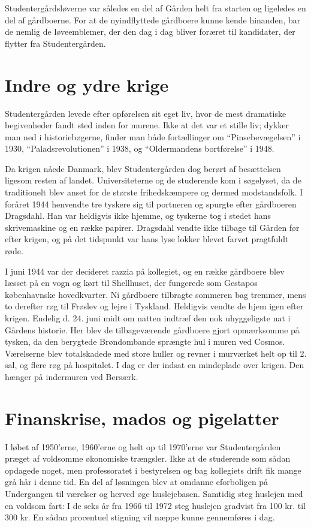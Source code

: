 \documentclass[11pt,article,twoside,openany,danish,extrafontsizes]{memoir} %
\begin{document}
Studentergårdsløverne var således en del af Gården helt fra starten og ligeledes en del af gårdboerne. For at de nyindflyttede gårdboere kunne kende hinanden, bar de nemlig de løveemblemer, der den dag i dag bliver foræret til kandidater, der flytter fra Studentergården.



\section{Indre og ydre krige}
Studentergården levede efter opførelsen sit eget liv, hvor de mest dramatiske begivenheder fandt sted inden for murene. Ikke at det var et stille liv; dykker man ned i historiebøgerne, finder man både fortællinger om \enquote{Pinsebevægelsen} i 1930, \enquote{Paladsrevolutionen} i 1938, og \enquote{Oldermandens bortførelse} i 1948.

Da krigen nåede Danmark, blev Studentergården dog berørt af besættelsen ligesom resten af landet. Universiteterne og de studerende kom i søgelyset, da de traditionelt blev anset for de største frihedskæmpere og dermed modstandsfolk. I foråret 1944 henvendte tre tyskere sig til portneren og spurgte efter gårdboeren Dragsdahl. Han var heldigvis ikke hjemme, og tyskerne tog i stedet hans skrivemaskine og en række papirer. Dragsdahl vendte ikke tilbage til Gården før efter krigen, og på det tidspunkt var hans lyse lokker blevet farvet pragtfuldt røde.

I juni 1944 var der decideret razzia på kollegiet, og en række gårdboere blev læsset på en vogn og kørt til Shellhuset, der fungerede som Gestapos københavnske hovedkvarter. Ni gårdboere tilbragte sommeren bag tremmer, mens to derefter røg til Frøslev og lejre i Tyskland. Heldigvis vendte de hjem igen efter krigen. Endelig d. 24. juni midt om natten indtræf den nok uhyggeligste nat i Gårdens historie. Her blev de tilbageværende gårdboere gjort opmærksomme på tysken, da den berygtede Brøndombande sprængte hul i muren ved Cosmos. Værelserne blev totalskadede med store huller og revner i murværket helt op til 2. sal, og flere røg på hospitalet. I dag er der indsat en mindeplade over krigen. Den hænger på indermuren ved Bersærk.



\section{Finanskrise, mados og pigelatter}
I løbet af 1950’erne, 1960’erne og helt op til 1970’erne var Studentergården præget af voldsomme økonomiske trængsler. Ikke at de studerende som sådan opdagede noget, men professoratet i bestyrelsen og bag kollegiets drift fik mange grå hår i denne tid. En del af løsningen blev at omdanne eforboligen på Undergangen til værelser og herved øge huslejebasen. Samtidig steg huslejen med en voldsom fart: I de seks år fra 1966 til 1972 steg huslejen gradvist fra 100 kr. til 300 kr. En sådan procentuel stigning vil næppe kunne gennemføres i dag.
\end{document}
